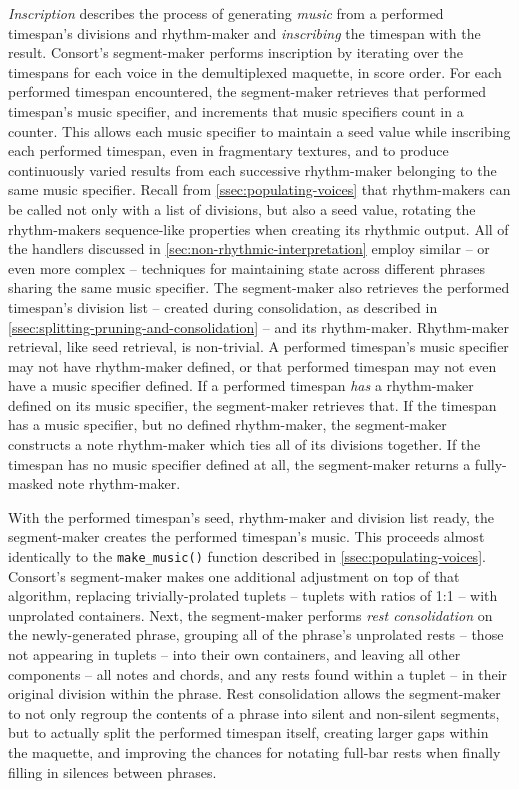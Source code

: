 \emph{Inscription} describes the process of generating \emph{music} from a
performed timespan's divisions and rhythm-maker and \emph{inscribing} the
timespan with the result. Consort's segment-maker performs inscription by
iterating over the timespans for each voice in the demultiplexed maquette, in
score order. For each performed timespan encountered, the segment-maker
retrieves that performed timespan's music specifier, and increments that music
specifiers count in a counter. This allows each music specifier to maintain a
seed value while inscribing each performed timespan, even in fragmentary
textures, and to produce continuously varied results from each successive
rhythm-maker belonging to the same music specifier. Recall from
\autoref{ssec:populating-voices} that rhythm-makers can be called not only with
a list of divisions, but also a seed value, rotating the rhythm-makers
sequence-like properties when creating its rhythmic output. All of the handlers
discussed in \autoref{sec:non-rhythmic-interpretation} employ similar -- or
even more complex -- techniques for maintaining state across different phrases
sharing the same music specifier.
The segment-maker also retrieves the performed timespan's division list --
created during consolidation, as described in
\autoref{ssec:splitting-pruning-and-consolidation} -- and its rhythm-maker.
Rhythm-maker retrieval, like seed retrieval, is non-trivial. A performed
timespan's music specifier may not have rhythm-maker defined, or that performed
timespan may not even have a music specifier defined. If a performed timespan
\emph{has} a rhythm-maker defined on its music specifier, the segment-maker
retrieves that. If the timespan has a music specifier, but no defined
rhythm-maker, the segment-maker constructs a note rhythm-maker which ties all
of its divisions together. If the timespan has no music specifier defined at
all, the segment-maker returns a fully-masked note rhythm-maker.

With the performed timespan's seed, rhythm-maker and division list ready, the
segment-maker creates the performed timespan's music. This proceeds almost
identically to the \texttt{make\_music()} function described in
\autoref{ssec:populating-voices}. Consort's segment-maker makes one additional
adjustment on top of that algorithm, replacing trivially-prolated tuplets --
tuplets with ratios of 1:1 -- with unprolated containers. Next, the
segment-maker performs \emph{rest consolidation} on the newly-generated phrase,
grouping all of the phrase's unprolated rests -- those not appearing in tuplets
-- into their own containers, and leaving all other components -- all notes and
chords, and any rests found within a tuplet -- in their original division
within the phrase. Rest consolidation allows the segment-maker to not only
regroup the contents of a phrase into silent and non-silent segments, but to
actually split the performed timespan itself, creating larger gaps within the
maquette, and improving the chances for notating full-bar rests when finally
filling in silences between phrases.

